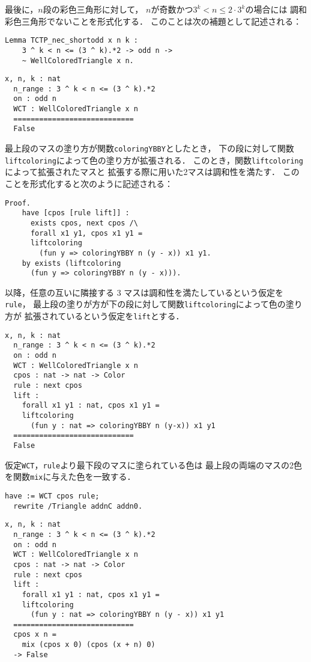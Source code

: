 最後に，$n$段の彩色三角形に対して，
$n$が奇数かつ$3^{k} < n \leq 2 \cdot 3^{k}$の場合には
調和彩色三角形でないことを形式化する．
このことは次の補題として記述される：
\begin{lstlisting}[language=Coq]
  Lemma TCTP_nec_shortodd x n k :
    3 ^ k < n <= (3 ^ k).*2 -> odd n ->
    ~ WellColoredTriangle x n.
\end{lstlisting}
\begin{lstlisting}[language=Coq]
  x, n, k : nat
  n_range : 3 ^ k < n <= (3 ^ k).*2
  on : odd n
  WCT : WellColoredTriangle x n
  ============================
  False
\end{lstlisting}
最上段のマスの塗り方が関数{\tt{coloringYBBY}}としたとき，
下の段に対して関数{\tt{liftcoloring}}によって色の塗り方が拡張される．
このとき，関数{\tt{liftcoloring}}によって拡張されたマスと
拡張する際に用いた2マスは調和性を満たす．
このことを形式化すると次のように記述される：
\begin{lstlisting}[language=Coq]
  Proof.
    have [cpos [rule lift]] :
      exists cpos, next cpos /\
      forall x1 y1, cpos x1 y1 =
      liftcoloring
        (fun y => coloringYBBY n (y - x)) x1 y1.
    by exists (liftcoloring
      (fun y => coloringYBBY n (y - x))).
\end{lstlisting}
以降，任意の互いに隣接する 3 マスは調和性を満たしているという仮定を{\tt{rule}}，
最上段の塗りが方が下の段に対して関数{\tt{liftcoloring}}によって色の塗り方が
拡張されているという仮定を{\tt{lift}}とする．
\begin{lstlisting}[language=Coq]
  x, n, k : nat
  n_range : 3 ^ k < n <= (3 ^ k).*2
  on : odd n
  WCT : WellColoredTriangle x n
  cpos : nat -> nat -> Color
  rule : next cpos
  lift :
    forall x1 y1 : nat, cpos x1 y1 =
    liftcoloring
      (fun y : nat => coloringYBBY n (y-x)) x1 y1
  ============================
  False
\end{lstlisting}
仮定{\tt{WCT}}，{\tt{rule}}より最下段のマスに塗られている色は
最上段の両端のマスの2色を関数{\tt{mix}}に与えた色を一致する．
\begin{lstlisting}[language=Coq]
  have := WCT cpos rule;
  rewrite /Triangle addnC addn0.
\end{lstlisting}
\begin{lstlisting}[language=Coq]
  x, n, k : nat
  n_range : 3 ^ k < n <= (3 ^ k).*2
  on : odd n
  WCT : WellColoredTriangle x n
  cpos : nat -> nat -> Color
  rule : next cpos
  lift :
    forall x1 y1 : nat, cpos x1 y1 =
    liftcoloring
      (fun y : nat => coloringYBBY n (y - x)) x1 y1
  ============================
  cpos x n =
    mix (cpos x 0) (cpos (x + n) 0)
  -> False
\end{lstlisting}
